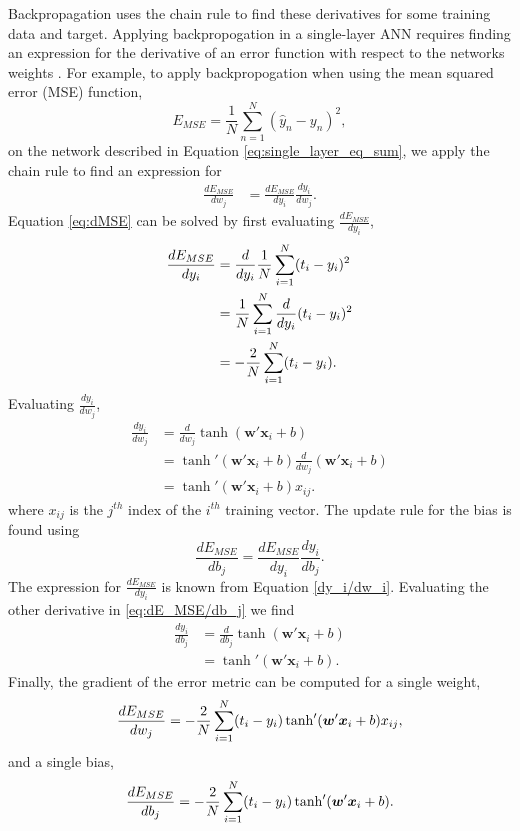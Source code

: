 Backpropagation uses the chain rule to find these derivatives for some training data and target. Applying backpropogation in a single-layer ANN requires finding an expression for the derivative of an error function with respect to the networks weights \cite{Nielsen2015}. For example, to apply backpropogation when using the mean squared error (MSE) function,
%
\begin{equation} \label{eq:MSE_error}
E_{MSE} = {\frac{1} N} \sum_{n=1}^N (\hat{y}_n - y_n)^2,
\end{equation}
%
on the network described in Equation \ref{eq:single_layer_eq_sum}, we apply the chain rule to find an expression for
%
\begin{align} \label{eq:dMSE}
\frac{dE_{MSE}}{dw_j} &= \frac{dE_{MSE}}{dy_i} \frac{dy_i}{dw_j}.
\end{align}
%
Equation \ref{eq:dMSE} can be solved by first evaluating $\frac{dE_{MSE}}{dy_i}$,
%
\begin{align} \label{dE_{MSE}/dy_i}
\frac{dE_{MSE}}{dy_i}  &= \frac{d}{dy_i} \frac{1}{N} \sum_{i=1}^N(t_i - y_i)^2 \\
&= \frac{1}{N} \sum_{i=1}^N  \frac{d}{dy_i} (t_i - y_i)^2 \nonumber \\
&=  -\frac{2}{N} \sum_{i=1}^N  (t_i - y_i). \nonumber
\end{align}
%
Evaluating $\frac{dy_i}{dw_j}$,
%
\begin{align} \label{dy_i/dw_i}
\frac{dy_i}{dw_j}  &= \frac{d}{dw_j} \tanh( \boldsymbol{w}' \boldsymbol{x}_i + b) \\
&= \tanh'( \boldsymbol{w}' \boldsymbol{x}_i + b) \frac{d}{dw_j}( \boldsymbol{w}' \boldsymbol{x}_i + b) \nonumber \\
&= \tanh'( \boldsymbol{w}' \boldsymbol{x}_i + b)  x_{ij}. \nonumber
\end{align}
%
\noindent where $x_{ij}$ is the $j^{th}$ index of the $i^{th}$ training vector.
%
The update rule for the bias is found using
%
\begin{equation} \label{eq:dE_MSE/db_j}
\frac{dE_{MSE}}{db_j} = \frac{dE_{MSE}}{dy_i} \frac{dy_i}{db_j}.
\end{equation}
%
The expression for $\frac{dE_{MSE}}{dy_i}$ is known from Equation \ref{dy_i/dw_i}. Evaluating the other derivative in \ref{eq:dE_MSE/db_j} we find
%
\begin{align}
\frac{dy_i}{db_j} &= \frac{d}{db_j} \tanh(\boldsymbol{w}'\boldsymbol{x}_i + b) \\
 &= \tanh'( \boldsymbol{w}' \boldsymbol{x}_i + b). \nonumber
\end{align}
Finally, the gradient of the error metric can be computed for a single weight, 
%
\begin{equation} \label{eq:dE_{MSE}/dw_j_final}
\frac{dE_{MSE}}{dw_j} =  -\frac{2}{N} \sum_{i=1}^N  (t_i - y_i) \tanh'( \boldsymbol{w}' \boldsymbol{x}_i + b)  x_{ij},
\end{equation}
%
and a single bias,
%
\begin{equation} \label{eq:dE_{MSE}/db_j_final}
\frac{dE_{MSE}}{db_j} =  -\frac{2}{N} \sum_{i=1}^N  (t_i - y_i) \tanh'( \boldsymbol{w}' \boldsymbol{x}_i + b).
\end{equation}

